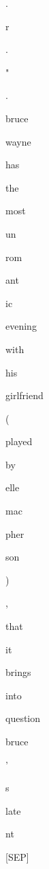 \documentclass[varwidth=150mm]{standalone}
\begin{document}
\begin{CJK*}{UTF8}{gbsn}
{{{\colorbox{red!7.898767948150635}{\strut .} \colorbox{red!4.3261189460754395}{\strut r} \colorbox{red!9.05876350402832}{\strut .} \colorbox{red!18.017671585083008}{\strut "} \colorbox{red!48.86363983154297}{\strut .} \colorbox{red!19.36823844909668}{\strut bruce} \colorbox{red!47.32929229736328}{\strut wayne} \colorbox{red!25.548067092895508}{\strut has} \colorbox{red!48.56941604614258}{\strut the} \colorbox{red!2.9507288932800293}{\strut most} \colorbox{red!1.028388500213623}{\strut un}\colorbox{red!1.0873119831085205}{\strut rom}\colorbox{red!1.6000707149505615}{\strut ant}\colorbox{red!3.785184860229492}{\strut ic} \colorbox{red!1.9210724830627441}{\strut evening} \colorbox{red!0.0}{\strut with} \colorbox{red!1.1667886972427368}{\strut his} \colorbox{red!0.0}{\strut girlfriend} \colorbox{red!1.8040993213653564}{\strut (} \colorbox{red!7.708461761474609}{\strut played} \colorbox{red!1.6884688138961792}{\strut by} \colorbox{red!1.9674454927444458}{\strut elle} \colorbox{red!1.606187343597412}{\strut mac}\colorbox{red!7.686649322509766}{\strut pher}\colorbox{red!4.005659580230713}{\strut son} \colorbox{red!0.0}{\strut )} \colorbox{red!2.4676942825317383}{\strut ,} \colorbox{red!1.2418766021728516}{\strut that} \colorbox{red!0.0}{\strut it} \colorbox{red!4.024651050567627}{\strut brings} \colorbox{red!0.0}{\strut into} \colorbox{red!2.393580913543701}{\strut question} \colorbox{red!38.19325637817383}{\strut bruce} \colorbox{red!9.016946792602539}{\strut '} \colorbox{red!17.317602157592773}{\strut s} \colorbox{red!0.0}{\strut late}\colorbox{red!3.784916639328003}{\strut nt} \colorbox{red!10.444541931152344}{\strut [SEP]}
}}}
\end{CJK*}
\end{document}
